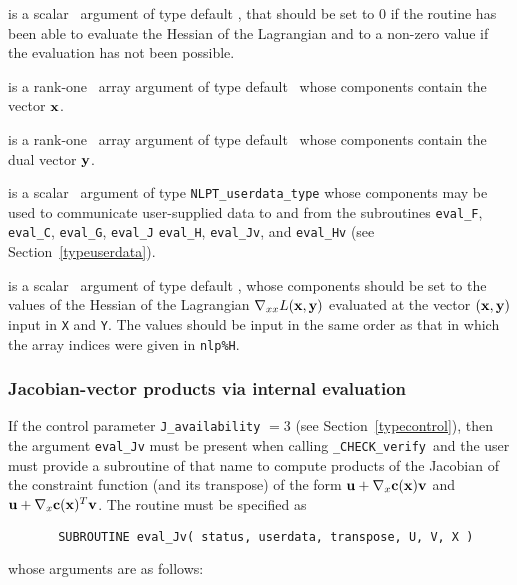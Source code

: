 \documentclass{galahad}
\newcommand{\packagename}{CHECK}
\newcommand{\fullpackagename}{\libraryname\_\packagename}
\newcommand{\solver}{{\tt \fullpackagename\_verify}}
\begin{document}
\begin{description}

 is a scalar \intentout\ argument of type default \integer,
that should be set to 0 if the routine has been able to evaluate
the Hessian of the Lagrangian 
and to a non-zero value if the evaluation has not been possible.

 is a rank-one \intentin\ array argument of type default \realdp\
whose components contain the vector ${\mathbf{x}}$.

 is a rank-one \intentin\ array argument of type default \realdp\
whose components contain the dual vector ${\mathbf{y}}$.

 is a scalar \intentinout\ argument of type 
{\tt NLPT\_userdata\_type} whose components may be used
to communicate user-supplied data to and from the
subroutines {\tt eval\_F}, {\tt eval\_C}, {\tt eval\_G}, {\tt eval\_J}
{\tt eval\_H}, {\tt eval\_Jv}, and {\tt eval\_Hv} 
(see Section~\ref{typeuserdata}). 

 is a scalar \intentout\ argument of type default \realdp,
whose components should be set to the values of the Hessian
of the Lagrangian $\nabla_{xx} L({\mathbf{x}},{\mathbf{y}})$
evaluated at the vector $({\mathbf{x}},{\mathbf{y}})$ input in {\tt X} and {\tt Y}. The values should
be input in the same order as that in which the array indices were
given in {\tt nlp\%H}.

\end{description}


\subsubsection{Jacobian-vector products via internal evaluation\label{jvfv}}

If the control parameter {\tt J\_availability} $=3$ (see
Section~\ref{typecontrol}), then the argument {\tt eval\_Jv} must be
present when calling \solver\ and the
user must provide a subroutine of that name to compute
products of the Jacobian of the constraint function (and its transpose)
of the form ${\mathbf{u}} + \nabla_{x} {\mathbf{c}}({\mathbf{x}}){\mathbf{v}}$ and
${\mathbf{u}} + \nabla_{x} {\mathbf{c}}({\mathbf{x}})^T{\mathbf{v}}$.
The routine must be specified as

\def\baselinestretch{0.8}
{\tt \begin{verbatim}
       SUBROUTINE eval_Jv( status, userdata, transpose, U, V, X ) \end{verbatim} }
\def\baselinestretch{1.0}
\noindent whose arguments are as follows:
\end{document}
